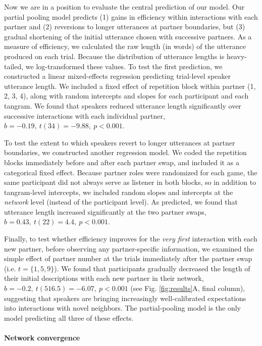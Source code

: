 Now we are in a position to evaluate the central prediction of our model.
Our partial pooling model predicts (1) gains in efficiency within interactions with each partner and (2) reversions to longer utterances at partner boundaries, but (3) gradual shortening of  the initial utterance chosen with successive partners.
As a measure of efficiency, we calculated the raw length (in words) of the utterance produced on each trial.
Because the distribution of utterance lengths is heavy-tailed, we log-transformed these values.
To test the first prediction, we constructed a linear mixed-effects regression predicting trial-level speaker utterance length.
We included a fixed effect of repetition block within partner (1, 2, 3, 4), along with random intercepts and slopes for each participant and each tangram. 
We found that speakers reduced utterance length significantly over successive interactions with each individual partner, $b = -0.19,~t(34) = -9.88,~p < 0.001$.

To test the extent to which speakers revert to longer utterances at partner boundaries, we constructed another regression model.
We coded the repetition blocks immediately before and after each partner swap, and included it as a categorical fixed effect.
Because partner roles were randomized for each game, the same participant did not always serve as listener in both blocks, so in addition to tangram-level intercepts, we included random slopes and intercepts at the \emph{network} level (instead of the participant level).
As predicted, we found that utterance length increased significantly at the two partner swaps, $b = 0.43,~t(22) = 4.4,~p < 0.001$.

Finally, to test whether efficiency improves for the \emph{very first} interaction with each new partner, before observing any partner-specific information, we examined the simple effect of partner number at the trials immediately after the partner swap (i.e. $t=\{1,5,9\}$).
We found that participants gradually decreased the length of their initial descriptions with each new partner in their network, $b = -0.2,~t(516.5) = -6.07,~p < 0.001$ (see Fig. \ref{fig:results}A, final column), suggesting that speakers are bringing increasingly well-calibrated expectations into interactions with novel neighbors.
The partial-pooling model is the only model predicting all three of these effects.

\paragraph{Network convergence}

